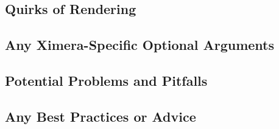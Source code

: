 \documentclass{ximera}
\begin{document}
    \subsection*{Quirks of Rendering}
        
        
        
    \subsection*{Any Ximera-Specific Optional Arguments}
        
        
        
    \subsection*{Potential Problems and Pitfalls}
        
        
        
    \subsection*{Any Best Practices or Advice}
        
        
        
\end{document}
